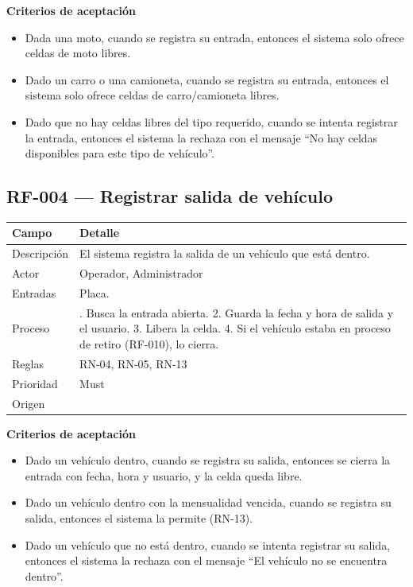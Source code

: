 \textbf{Criterios de aceptación}
\begin{itemize}
  \item Dada una moto, cuando se registra su entrada, entonces el sistema solo ofrece celdas de moto libres.
  \item Dado un carro o una camioneta, cuando se registra su entrada, entonces el sistema solo ofrece celdas de carro/camioneta libres.
  \item Dado que no hay celdas libres del tipo requerido, cuando se intenta registrar la entrada, entonces el sistema la rechaza con el mensaje ``No hay celdas disponibles para este tipo de vehículo''.
\end{itemize}

\subsection{RF-004 — Registrar salida de vehículo}
\begin{longtable}{>{\raggedright\arraybackslash}p{3.2cm}>{\raggedright\arraybackslash}p{11.2cm}}
\toprule
\textbf{Campo} & \textbf{Detalle}\\
\midrule\endhead
Descripción & El sistema registra la salida de un vehículo que está dentro.\\
Actor & Operador, Administrador\\
Entradas & Placa.\\
Proceso & 1. Busca la entrada abierta. 2. Guarda la fecha y hora de salida y el usuario. 3. Libera la celda. 4. Si el vehículo estaba en proceso de retiro (RF-010), lo cierra.\\
Reglas & RN-04, RN-05, RN-13\\
Prioridad & Must\\
Origen & [E]\\
\bottomrule
\end{longtable}

\textbf{Criterios de aceptación}
\begin{itemize}
  \item Dado un vehículo dentro, cuando se registra su salida, entonces se cierra la entrada con fecha, hora y usuario, y la celda queda libre.
  \item Dado un vehículo dentro con la mensualidad vencida, cuando se registra su salida, entonces el sistema la permite (RN-13).
  \item Dado un vehículo que no está dentro, cuando se intenta registrar su salida, entonces el sistema la rechaza con el mensaje ``El vehículo no se encuentra dentro''.
\end{itemize}

